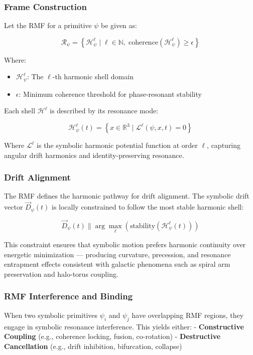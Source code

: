 \documentclass[12pt]{article}
\begin{document}
\subsubsection{Frame Construction}

Let the RMF for a primitive \( \psi \) be given as:

\[
\mathcal{R}_\psi = \left\{ \mathcal{H}_\psi^\ell \mid \ell \in \mathbb{N}, \; \text{coherence}(\mathcal{H}_\psi^\ell) \geq \epsilon \right\}
\]

Where:
\begin{itemize}[noitemsep]
  \item \( \mathcal{H}_\psi^\ell \): The \( \ell \)-th harmonic shell domain
  \item \( \epsilon \): Minimum coherence threshold for phase-resonant stability
\end{itemize}

Each shell \( \mathcal{H}^\ell \) is described by its resonance mode:

\[
\mathcal{H}_\psi^\ell(t) = \left\{ x \in \mathbb{R}^3 \mid \mathcal{L}^\ell(\psi, x, t) = 0 \right\}
\]

Where \( \mathcal{L}^\ell \) is the symbolic harmonic potential function at order \( \ell \), capturing angular drift harmonics and identity-preserving resonance.

\subsubsection{Drift Alignment}

The RMF defines the harmonic pathway for drift alignment. The symbolic drift vector \( \vec{D}_\psi(t) \) is locally constrained to follow the most stable harmonic shell:

\[
\vec{D}_\psi(t) \parallel \arg\max_\ell \left( \text{stability}(\mathcal{H}_\psi^\ell(t)) \right)
\]

This constraint ensures that symbolic motion prefers harmonic continuity over energetic minimization — producing curvature, precession, and resonance entrapment effects consistent with galactic phenomena such as spiral arm preservation and halo-torus coupling.

\subsubsection{RMF Interference and Binding}

When two symbolic primitives \( \psi_i \) and \( \psi_j \) have overlapping RMF regions, they engage in symbolic resonance interference. This yields either:
- \textbf{Constructive Coupling} (e.g., coherence locking, fusion, co-rotation)
- \textbf{Destructive Cancellation} (e.g., drift inhibition, bifurcation, collapse)
\end{document}
